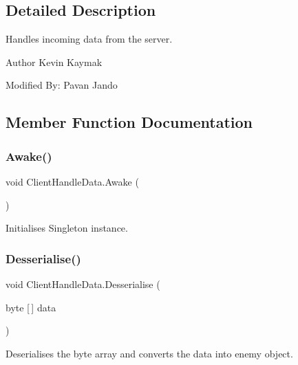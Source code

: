 \subsection{Detailed Description}
Handles incoming data from the server. 

\begin{DoxyAuthor}{Author}
Kevin Kaymak 

Modified By\+: Pavan Jando
\end{DoxyAuthor}


\subsection{Member Function Documentation}
\mbox{\label{class_client_handle_data_aa64ba3f18a724bd131ac488e2fa0e744}} 
\subsubsection{\texorpdfstring{Awake()}{Awake()}}
{\footnotesize\ttfamily void Client\+Handle\+Data.\+Awake (\begin{DoxyParamCaption}{ }\end{DoxyParamCaption})\hspace{0.3cm}{\ttfamily [private]}}



Initialises Singleton instance. 

\mbox{\label{class_client_handle_data_a1c02a29592a27b304e7f465dada3f92f}} 
\subsubsection{\texorpdfstring{Desserialise()}{Desserialise()}}
{\footnotesize\ttfamily void Client\+Handle\+Data.\+Desserialise (\begin{DoxyParamCaption}\item[{byte \mbox{[}$\,$\mbox{]}}]{data }\end{DoxyParamCaption})\hspace{0.3cm}{\ttfamily [private]}}



Deserialises the byte array and converts the data into enemy object. 


